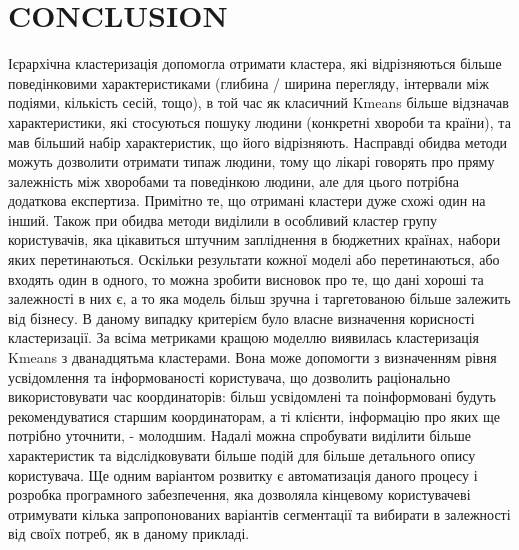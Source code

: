 \chapter*{CONCLUSION}						%


%
Ієрархічна кластеризація допомогла отримати кластера, які відрізняються
більше поведінковими характеристиками (глибина / ширина перегляду,
інтервали між подіями, кількість сесій, тощо), в той час як класичний Kmeans
більше відзначав характеристики, які стосуються пошуку людини (конкретні
хвороби та країни), та мав більший набір характеристик, що його відрізняють.
Насправді обидва методи можуть дозволити отримати типаж людини, тому що
лікарі говорять про пряму залежність між хворобами та поведінкою людини, але
для цього потрібна додаткова експертиза.
Примітно те, що отримані кластери дуже схожі один на інший. Також при
обидва методи виділили в особливий кластер групу користувачів, яка цікавиться
штучним запліднення в бюджетних країнах, набори яких перетинаються.
Оскільки результати кожної моделі або перетинаються, або входять один в
одного, то можна зробити висновок про те, що дані хороші та залежності в них
є, а то яка модель більш зручна і таргетованою більше залежить від бізнесу. В
даному випадку критерієм було власне визначення корисності кластеризації.
За всіма метриками кращою моделлю виявилась кластеризація Kmeans з
дванадцятьма кластерами. Вона може допомогти з визначенням рівня
усвідомлення та інформованості користувача, що дозволить раціонально
використовувати час координаторів: більш усвідомлені та поінформовані будуть
рекомендуватися старшим координаторам, а ті клієнти, інформацію про яких ще
потрібно уточнити, - молодшим.
Надалі
можна
спробувати
виділити
більше
характеристик
та
відслідковувати більше подій для більше детального опису користувача. Ще
одним варіантом розвитку є автоматизація даного процесу і розробка
програмного забезпечення, яка дозволяла кінцевому користувачеві отримувати
кілька запропонованих варіантів сегментації та вибирати в залежності від своїх
потреб, як в даному прикладі.